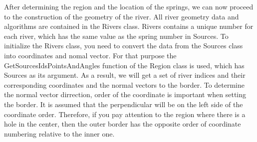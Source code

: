 \documentclass[]{pracamgr}
\begin{document}
      After determining the region and the location of the springs, we can now proceed to the construction of the geometry of the river. All river geometry data and algorithms are contained in the Rivers class. Rivers contains a unique number for each river, which has the same value as the spring number in Sources. To initialize the Rivers class, you need to convert the data from the Sources class into coordinates and nomal vector. For that purpose the GetSourcesIdsPointsAndAngles function of the Region class is used, which has Sources as its argument. As a result, we will get a set of river indices and their corresponding coordinates and the normal vectors to the border. To determine the normal vector dirrection, order of the coordinate is important when setting the border. It is assumed that the perpendicular will be on the left side of the coordinate order. Therefore, if you pay attention to the region where there is a hole in the center, then the outer border has the opposite order of coordinate numbering relative to the inner one.
      
\end{document}
